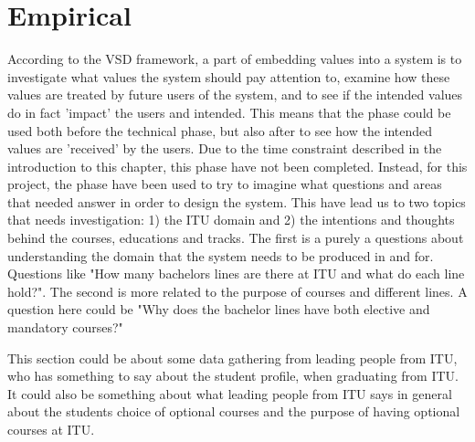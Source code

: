 \section{Empirical}
According to the VSD framework, a part of embedding values into a system is to investigate what values the system should pay attention to, examine how these values are treated by future users of the system, and to see if the intended values do in fact 'impact' the users and intended. This means that the phase could be used both before the technical phase, but also after to see how the intended values are 'received' by the users. \newline
Due to the time constraint described in the introduction to this chapter, this phase have not been completed. Instead, for this project, the phase have been used to try to imagine what questions and areas that needed answer in order to design the system. This have lead us to two topics that needs investigation: 1) the ITU domain and 2) the intentions and thoughts behind the courses, educations and tracks. The first is a purely a questions about understanding the domain that the system needs to be produced in and for. Questions like "How many bachelors lines are there at ITU and what do each line hold?". The second is more related to the purpose of courses and different lines. A question here could be "Why does the bachelor lines have both elective and mandatory courses?"

This section could be about some data gathering from leading people from ITU, who has something to say about the student profile, when graduating from ITU. It could also be something about what leading people from ITU says in general about the students choice of optional courses and the purpose of having optional courses at ITU. 


\newpage
